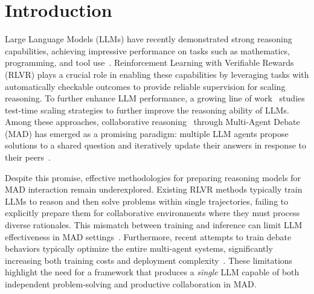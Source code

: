 \section{Introduction}
\label{sec:introduction}

Large Language Models (LLMs) have recently demonstrated strong reasoning capabilities, achieving impressive performance on tasks such as mathematics, programming, and tool use~\cite{guo2025deepseek,yang2025qwen3,liu2025deepseek}. Reinforcement Learning with Verifiable Rewards (RLVR) plays a crucial role in enabling these capabilities by leveraging tasks with automatically checkable outcomes to provide reliable supervision for scaling reasoning. To further enhance LLM performance, a growing line of work~\cite{wang2022self, xiong2025llava,wang2025llava,zheng2025parallel} studies test-time scaling strategies to further improve the reasoning ability of LLMs. Among these approaches, collaborative reasoning~\cite{du2023improving,liang2024encouraging} through Multi-Agent Debate (MAD) has emerged as a promising paradigm: multiple LLM agents propose solutions to a shared question and iteratively update their answers in response to their peers~\cite{choi2025debate,yi2025debate}. 

Despite this promise, effective methodologies for preparing reasoning models for MAD interaction remain underexplored. Existing RLVR methods typically train LLMs to reason and then solve problems within single trajectories, failing to explicitly prepare them for collaborative environments where they must process diverse rationales. This mismatch between training and inference can limit LLM effectiveness in MAD settings~\cite{choi2025debate,kumaran2025overconfidence,li2025off}. Furthermore, recent attempts to train debate behaviors typically optimize the entire multi-agent systems, significantly increasing both training costs and deployment complexity~\cite{liao2025marft,liu2025llm,marti2025,li2025advancing}. These limitations highlight the need for a framework that produces a \emph{single} LLM capable of both independent problem-solving and productive collaboration in MAD.

